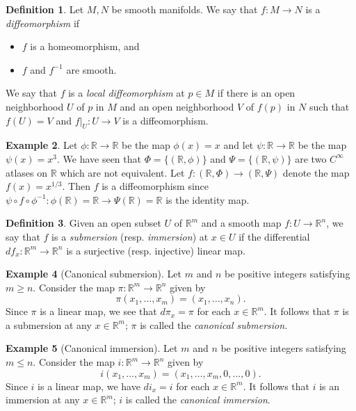 \documentclass{amsart}
\numberwithin{equation}{section}
\newcommand{\bR}{\mathbb{R}}
\theoremstyle{definition}
\newtheorem{definition}{Definition} [section]
\newtheorem{example}[definition]{Example}
\theoremstyle{theorem}
\begin{document}
\begin{definition}
Let $M, N$ be smooth manifolds. We say that $f : M \to N$ is a {\em diffeomorphism} if 
\begin{itemize}
\item $f$ is a homeomorphism, and 
\item $f$ and $f^{-1}$ are smooth.
\end{itemize}
We say that $f$ is a {\em local diffeomorphism} at $p \in M$ if there is an open neighborhood $U$ 
of $p$ in $M$ and an open neighborhood $V$ of $f(p)$ in $N$ such that 
$f(U) = V$ and  $f|_{U} : U \to V$ is a diffeomorphism. 
\end{definition}

\begin{example}
Let $\phi : \bR \to \bR$ be the map $\phi(x) = x$ and let $\psi : \bR \to \bR$ be the map $\psi(x) = x^3$. We have seen that $\Phi=\{ (\bR,\phi)\}$ and $\Psi=\{(\bR,\psi)\}$ are two $C^\infty$ atlases on $\bR$ which are not equivalent.
Let $f : (\bR, \Phi) \to (\bR, \Psi)$ denote the map $f(x) = x^{1/3}$. 
Then $f$ is a diffeomorphism since $\psi\circ f\circ \phi^{-1}: \phi(\bR)=\bR \to \Psi(\bR)=\bR$ is the identity map.
\end{example}

\begin{definition}
Given an open subset $U$ of $\bR^m$ and a smooth map $f : U \to \bR^n$, 
we say that $f$ is a {\em submersion} (resp. {\em immersion}) at $x \in U$ if the differential 
$df_x : \bR^m \to \bR^n$ is a surjective (resp. injective) linear map.
 \end{definition}

\begin{example}[Canonical submersion]
Let $m$ and $n$ be positive integers satisfying $m \ge n$. Consider the map $\pi : \mathbb{R}^m \to \mathbb{R}^n$ given by 
\[
\pi(x_1, \ldots, x_m) = (x_1, \ldots, x_n).
\]
Since $\pi$ is a linear map, we see that $d \pi_x = \pi$ for each $x \in \bR^m$. 
It follows that $\pi$ is a submersion at any $x\in \bR^m$; $\pi$ is called the {\em canonical submersion}.
\end{example}

\begin{example}[Canonical immersion]
Let $m$ and $n$ be positive integers satisfying $m \leq n$. Consider the map 
$i : \bR^m \to \bR^n$ given by 
\[
i(x_1, \ldots, x_m) = (x_1, \ldots, x_m, 0, \ldots, 0).
\]
Since $i$ is a linear map, we have $d i_x = i$ for each $x \in \bR^m$. It follows that $i$ is an immersion
at any $x\in \bR^m$; $i$ is called the {\em canonical immersion}. 
\end{example}
\end{document}

